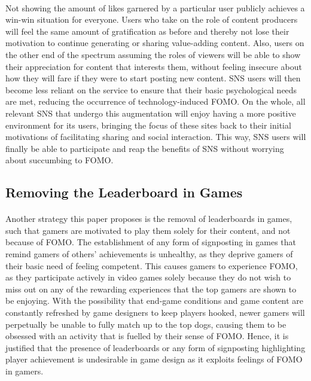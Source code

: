    \paragraph{}
        Not showing the amount of likes garnered by a particular user publicly achieves a win-win situation for everyone. Users who take on the role of content producers will feel the same amount of gratification as before and thereby not lose their motivation to continue generating or sharing value-adding content. Also, users on the other end of the spectrum assuming the roles of viewers will be able to show their appreciation for content that interests them, without feeling insecure about how they will fare if they were to start posting new content. SNS users will then become less reliant on the service to ensure that their basic psychological needs are met, reducing the occurrence of technology-induced FOMO. On the whole, all relevant SNS that undergo this augmentation will enjoy having a more positive environment for its users, bringing the focus of these sites back to their initial motivations of facilitating sharing and social interaction. This way, SNS users will finally be able to participate and reap the benefits of SNS without worrying about succumbing to FOMO.
 \subsection{Removing the Leaderboard in Games}
  \paragraph{}
        Another strategy this paper proposes is the removal of leaderboards in games, such that gamers are motivated to play them solely for their content, and not because of FOMO. The establishment of any form of signposting in games that remind gamers of others' achievements is unhealthy, as they deprive gamers of their basic need of feeling competent. This causes gamers to experience FOMO, as they participate actively in video games solely because they do not wish to miss out on any of the rewarding experiences that the top gamers are shown to be enjoying. With the possibility that end-game conditions and game content are constantly refreshed by game designers to keep players hooked, newer gamers will perpetually be unable to fully match up to the top dogs, causing them to be obsessed with an activity that is fuelled by their sense of FOMO. Hence, it is justified that the presence of leaderboards or any form of signposting highlighting player achievement is undesirable in game design as it exploits feelings of FOMO in gamers.
